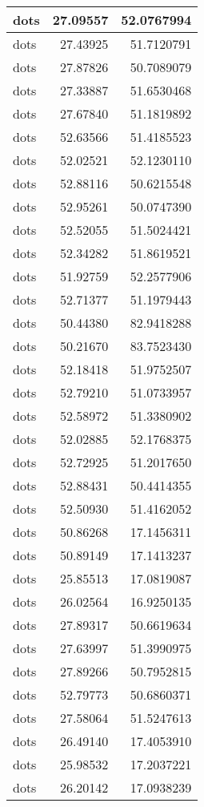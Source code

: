 \documentclass[
]{book}
\theoremstyle{definition}
\theoremstyle{definition}
\theoremstyle{definition}
\theoremstyle{definition}
\theoremstyle{remark}
\begin{document}
\begin{tabular}{l|r|r}
\hline
dots & 27.09557 & 52.0767994\\
\hline
dots & 27.43925 & 51.7120791\\
\hline
dots & 27.87826 & 50.7089079\\
\hline
dots & 27.33887 & 51.6530468\\
\hline
dots & 27.67840 & 51.1819892\\
\hline
dots & 52.63566 & 51.4185523\\
\hline
dots & 52.02521 & 52.1230110\\
\hline
dots & 52.88116 & 50.6215548\\
\hline
dots & 52.95261 & 50.0747390\\
\hline
dots & 52.52055 & 51.5024421\\
\hline
dots & 52.34282 & 51.8619521\\
\hline
dots & 51.92759 & 52.2577906\\
\hline
dots & 52.71377 & 51.1979443\\
\hline
dots & 50.44380 & 82.9418288\\
\hline
dots & 50.21670 & 83.7523430\\
\hline
dots & 52.18418 & 51.9752507\\
\hline
dots & 52.79210 & 51.0733957\\
\hline
dots & 52.58972 & 51.3380902\\
\hline
dots & 52.02885 & 52.1768375\\
\hline
dots & 52.72925 & 51.2017650\\
\hline
dots & 52.88431 & 50.4414355\\
\hline
dots & 52.50930 & 51.4162052\\
\hline
dots & 50.86268 & 17.1456311\\
\hline
dots & 50.89149 & 17.1413237\\
\hline
dots & 25.85513 & 17.0819087\\
\hline
dots & 26.02564 & 16.9250135\\
\hline
dots & 27.89317 & 50.6619634\\
\hline
dots & 27.63997 & 51.3990975\\
\hline
dots & 27.89266 & 50.7952815\\
\hline
dots & 52.79773 & 50.6860371\\
\hline
dots & 27.58064 & 51.5247613\\
\hline
dots & 26.49140 & 17.4053910\\
\hline
dots & 25.98532 & 17.2037221\\
\hline
dots & 26.20142 & 17.0938239\\

\end{tabular}
\end{document}
